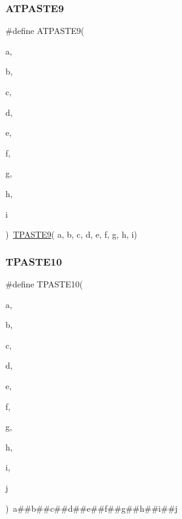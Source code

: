 \subsubsection{\texorpdfstring{ATPASTE9}{ATPASTE9}}
{\footnotesize\ttfamily \#define A\+T\+P\+A\+S\+T\+E9(\begin{DoxyParamCaption}\item[{}]{a,  }\item[{}]{b,  }\item[{}]{c,  }\item[{}]{d,  }\item[{}]{e,  }\item[{}]{f,  }\item[{}]{g,  }\item[{}]{h,  }\item[{}]{i }\end{DoxyParamCaption})~\mbox{\hyperlink{group__group__sam0__utils__tpaste_ga5440e5a665d859bec7c3527312d0889d}{T\+P\+A\+S\+T\+E9}}( a, b, c, d, e, f, g, h, i)}

\mbox{\label{group__group__sam0__utils__tpaste_ga0235b2e4ccf7a5b1d022a729a17a78a2}} 
\subsubsection{\texorpdfstring{TPASTE10}{TPASTE10}}
{\footnotesize\ttfamily \#define T\+P\+A\+S\+T\+E10(\begin{DoxyParamCaption}\item[{}]{a,  }\item[{}]{b,  }\item[{}]{c,  }\item[{}]{d,  }\item[{}]{e,  }\item[{}]{f,  }\item[{}]{g,  }\item[{}]{h,  }\item[{}]{i,  }\item[{}]{j }\end{DoxyParamCaption})~a\#\#b\#\#c\#\#d\#\#e\#\#f\#\#g\#\#h\#\#i\#\#j}

\mbox{\label{group__group__sam0__utils__tpaste_ga55fb148844f5ba993a992b609728e82e}} 
